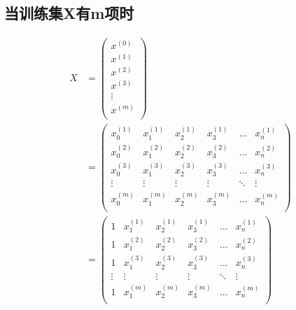 \subsection{当训练集X有m项时}
\begin{equation} \begin{aligned}
	X & = \left(\begin{matrix}
			x^{(0)} \\ x^{(1)} \\ x^{(2)} \\ x^{(3)} \\ \vdots \\ x^{(m)} \\
		\end{matrix}\right) \\
	& = \left( \begin{matrix}
			x_0^{(1)} & x_1^{(1)} & x_2^{(1)} & x_3^{(1)} & \dots & x_n^{(1)} \\
			x_0^{(2)} & x_1^{(2)} & x_2^{(2)} & x_3^{(2)} & \dots & x_n^{(2)} \\
			x_0^{(3)} & x_1^{(3)} & x_2^{(3)} & x_3^{(3)} & \dots & x_n^{(3)} \\
			\vdots    & \vdots    & \vdots    & \vdots    & \ddots & \vdots   \\
			x_0^{(m)} & x_1^{(m)} & x_2^{(m)} & x_3^{(m)} & \dots & x_n^{(m)} \\
			\end{matrix}\right) \\
	& = \left(\begin{matrix}
			1 & x_1^{(1)} & x_2^{(1)} & x_3^{(1)} & \dots & x_n^{(1)} \\
			1 & x_1^{(2)} & x_2^{(2)} & x_3^{(2)} & \dots & x_n^{(2)} \\
			1 & x_1^{(3)} & x_2^{(3)} & x_3^{(3)} & \dots & x_n^{(3)} \\
			\vdots    & \vdots    & \vdots    & \vdots    & \ddots & \vdots   \\
			1 & x_1^{(m)} & x_2^{(m)} & x_3^{(m)} & \dots & x_n^{(m)} \\
		\end{matrix}\right)
\end{aligned} \end{equation}


